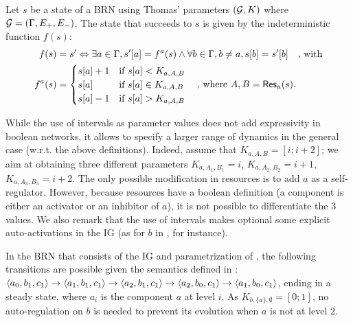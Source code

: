 \begin{definition}\label{def:dynamics}
Let $s$ be a state of a BRN using Thomas' parameters $(\mathcal{G}, K)$ where $\mathcal{G} = (\Gamma, E_+, E_-)$.
The state that succeeds to $s$ is given by the indeterministic function $f(s)$:
\begin{align*}
  f(s)  & = s' \Leftrightarrow \exists a \in \Gamma,
    \GRNget{s'}{a} = f^a(s) \wedge
    \forall b \in \Gamma, b \neq a, \GRNget{s}{b} = \GRNget{s'}{b}
    \quad\text{, with}\\
  f^a(s) & =
  \begin{cases}
    \GRNget{s}{a} + 1 & \text{if } \GRNget{s}{a} < K_{a,A,B} \\%
    \GRNget{s}{a} & \text{if } \GRNget{s}{a} \in K_{a,A,B} \\ %
    \GRNget{s}{a} - 1 & \text{if } \GRNget{s}{a} > K_{a,A,B} %
  \end{cases}
\quad\text{, where $A,B=\GRNres{a}{s}$.}
\end{align*}
\end{definition}

While the use of intervals as parameter values does not add expressivity in boolean
networks, it allows to specify a larger range of dynamics in the general case (w.r.t. the above
definitions).
Indeed, assume that $K_{a,A,B} = [i ; i+2]$;
we aim at obtaining three different parameters $K_{a,A_1,B_1} = i$,  $K_{a,A_2,B_2} = i+1$,
$K_{a,A_3,B_3} = i+2$.
The only possible modification in resources is to add $a$ as a self-regulator.
However, because resources have a boolean definition (a component is either an activator or an inhibitor of
$a$), it is not possible to differentiate the 3 values.
We also remark that the use of intervals makes optional some explicit auto-activations in the IG
(as for $b$ in , for instance).

\begin{example*}
In the BRN that consists of the IG and parametrization of , the following
transitions are possible given the semantics defined in :
$\mbox{$\langle a_0, b_1, c_1 \rangle$} \rightarrow \mbox{$\langle a_1, b_1, c_1 \rangle$} \rightarrow \mbox{$\langle a_2, b_1, c_1 \rangle$} \rightarrow
\mbox{$\langle a_2, b_0, c_1 \rangle$} \rightarrow \mbox{$\langle a_1, b_0, c_1 \rangle$}$,
ending in a steady state,
where $a_i$ is the component $a$ at level $i$.
As $K_{b,\{a\},\emptyset} = [0 ; 1]$, no auto-regulation on $b$ is needed to prevent its evolution when $a$ is not at level $2$.
\end{example*}

